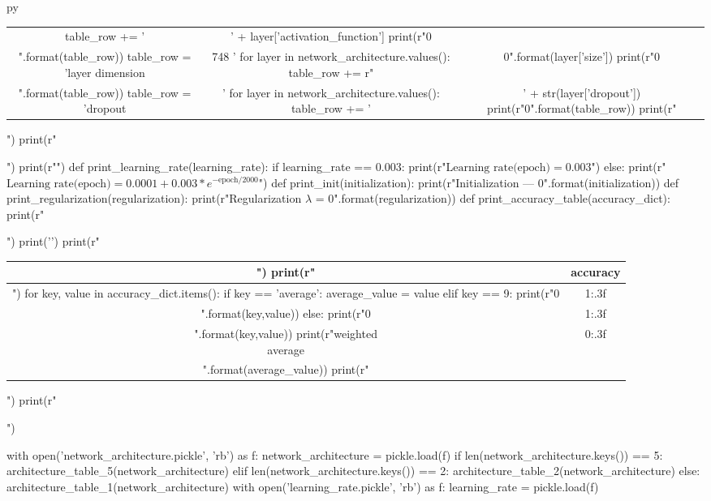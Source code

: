 \documentclass[11pt]{article}
\begin{document}
\begin{pythontexcustomcode}{py}
\begin{table}[H]
\begin{tabular}{cc|c}
        table_row += ' & ' + layer['activation_function']
    print(r"{0} \\".format(table_row))
    table_row = 'layer dimension & \LARGE 748 '
    for layer in network_architecture.values():
        table_row += r"& \LARGE {0}".format(layer['size'])
    print(r"{0} \\".format(table_row))
    table_row = 'dropout & '
    for layer in network_architecture.values():
        table_row += '& ' + str(layer['dropout'])
    print(r"{0}".format(table_row))
    print(r"\end{tabular}")
    print(r"\end{table}")
    print(r"")
def print_learning_rate(learning_rate):
    if learning_rate == 0.003:
        print(r"$\textrm{Learning rate(epoch)} = 0.003$")
    else:
        print(r"$\textrm{Learning rate(epoch)} = 0.0001 + 0.003 * e^{- \textrm{epoch}/2000}$")
def print_init(initialization):
    print(r"Initialization --- {0}".format(initialization))
def print_regularization(regularization):
    print(r"Regularization $\lambda$ = {0}".format(regularization))
def print_accuracy_table(accuracy_dict):
    print(r"\begin{table}[H]")
    print('\centering')
    print(r"\begin{tabular}{c|c}")
    print(r" & accuracy \\ \hline")
    for key, value in accuracy_dict.items():
        if key == 'average':
            average_value = value
        elif key == 9:
            print(r"{0} & {1:.3f} \\ \hline".format(key,value))
        else:
            print(r"{0} & {1:.3f} \\".format(key,value))
    print(r"\makecell{{weighted \\ average}} & {0:.3f} \\".format(average_value))
    print(r"\end{tabular}")
    print(r"\end{table}")
\end{pythontexcustomcode}
\begin{pycode}
with open('network_architecture.pickle', 'rb') as f:
    network_architecture = pickle.load(f)
if len(network_architecture.keys()) == 5:
    architecture_table_5(network_architecture)
elif len(network_architecture.keys()) == 2:
    architecture_table_2(network_architecture)
else:
    architecture_table_1(network_architecture)
with open('learning_rate.pickle', 'rb') as f:
    learning_rate = pickle.load(f)
\end{pycode}
\end{document}
